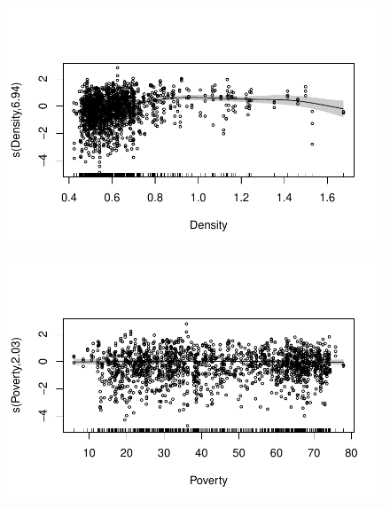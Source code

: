 \documentclass[
  letterpaper,
  DIV=11,
  numbers=noendperiod]{scrartcl}
\begin{document}
\begin{figure}[H]

{\centering \includegraphics{Group34Coursework_files/figure-pdf/unnamed-chunk-17-4.pdf}

}

\end{figure}

\begin{figure}[H]

{\centering \includegraphics{Group34Coursework_files/figure-pdf/unnamed-chunk-17-5.pdf}

}

\end{figure}
\end{document}
